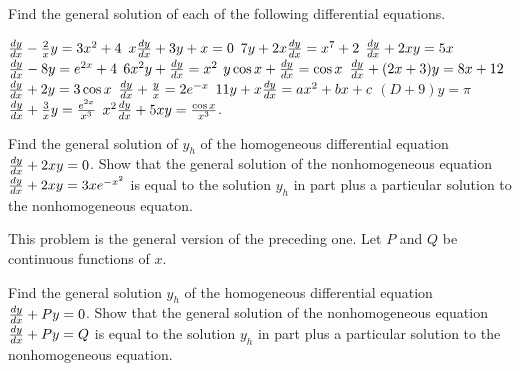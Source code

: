 \begin{exercises}

Find the general solution of each of the following
differential equations.
\begin{exenum}
\x
$\frac{d y}{d x} - \frac2xy = 3x^2 + 4$
\x
$x\frac{d y}{d x} + 3y + x = 0$
\x
$7y + 2x\frac{d y}{d x} = x^7 + 2$
\x
$\frac{d y}{d x} + 2xy = 5x$
\x
$\frac{d y}{d x} - 8y = e^{2x} + 4$
\x
$6x^2y + \frac{d y}{d x} = x^2$
\x
$y\cos x + \frac{d y}{d x} = \cos x$
\x
$\frac{d y}{d x} + (2x+3)y = 8x + 12$
\x
$\frac{d y}{d x} + 2y = 3 \cos x$
\x
$\frac{d y}{d x} + \frac yx = 2e^{-x}$
\x
$11y+x\frac{d y}{d x} = ax^2+bx+c$
\x
$(D+9)y = \pi$
\x
$\frac{d y}{d x} + \frac3xy = \frac{e^{2x}}{x^3}$
\x
$x^2\frac{d y}{d x} + 5xy = \frac{\cos x}{x^3}$.
\end{exenum}

\begin{exenum}
\x
{}
Find the general solution of $y_h$ of the homogeneous
differential equation $\frac{d y}{d x} + 2xy = 0$.
\x
Show that the general solution of the nonhomogeneous
equation $\frac{d y}{d x} + 2xy = 3xe^{-x^2}$
is equal to the solution $y_h$ in part 
plus a particular solution to the nonhomogeneous
equaton.
\end{exenum}

This problem is the general version of the preceding
one.  Let $P$ and $Q$ be continuous functions of $x$.
\begin{exenum}
\x
{}
Find the general solution $y_h$ of the homogeneous
differential equation $\frac{d y}{d x} + Py = 0$.
\x
Show that the general solution of the nonhomogeneous
equation $\frac{d y}{d x} +Py = Q$ is equal to the solution
$y_h$ in part  plus a particular solution
to the nonhomogeneous equation.
\end{exenum}






















\end{exercises}
